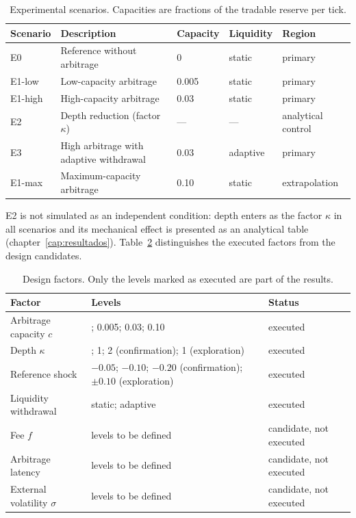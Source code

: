 \begin{table}[htbp]
\centering
\caption{Experimental scenarios. Capacities are fractions of the tradable reserve per tick.}
\label{tab:escenarios}
\small
\begin{tabularx}{\textwidth}{@{}l >{\raggedright\arraybackslash}X l l l@{}}
\toprule
Scenario & Description & Capacity & Liquidity & Region \\
\midrule
E0 & Reference without arbitrage & 0 & static & primary \\
E1-low & Low-capacity arbitrage & 0.005 & static & primary \\
E1-high & High-capacity arbitrage & 0.03 & static & primary \\
E2 & Depth reduction (factor $\kappa$) & --- & --- & analytical control \\
E3 & High arbitrage with adaptive withdrawal & 0.03 & adaptive & primary \\
E1-max & Maximum-capacity arbitrage & 0.10 & static & extrapolation \\
\bottomrule
\end{tabularx}
\end{table}

E2 is not simulated as an independent condition: depth enters as the factor $\kappa$ in all scenarios and its mechanical effect is presented as an analytical table (chapter~\ref{cap:resultados}). Table~\ref{tab:factores} distinguishes the executed factors from the design candidates.

\begin{table}[htbp]
\centering
\caption{Design factors. Only the levels marked as executed are part of the results.}
\label{tab:factores}
\small
\begin{tabularx}{\textwidth}{@{}l >{\raggedright\arraybackslash}X l@{}}
\toprule
Factor & Levels & Status \\
\midrule
Arbitrage capacity $c$ & 0; 0.005; 0.03; 0.10 & executed \\
Depth $\kappa$ & 0.5; 1; 2 (confirmation); 1 (exploration) & executed \\
Reference shock & $-0.05$; $-0.10$; $-0.20$ (confirmation); $\pm0.10$ (exploration) & executed \\
Liquidity withdrawal & static; adaptive & executed \\
Fee $f$ & levels to be defined & candidate, not executed \\
Arbitrage latency & levels to be defined & candidate, not executed \\
External volatility $\sigma$ & levels to be defined & candidate, not executed \\
\bottomrule
\end{tabularx}
\end{table}

